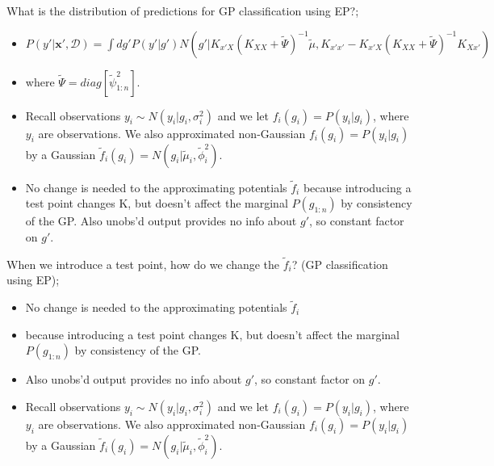 \documentclass{article}
\begin{document}
What is the distribution of predictions for GP classification using EP?; \begin{itemize}
    \item $P(y'|\mathbf{x'}, \mathcal{D}) = \int dg' P(y'|g')N(g' | K_{x'X}(K_{XX}+\tilde{\Psi})^{-1}\tilde{\mu}, K_{x'x'} - K_{x'X}(K_{XX}+\tilde{\Psi})^{-1}K_{Xx'})$
    \item where $\tilde{\Psi} = diag[\tilde{\psi}^2_{1:n}]$.
    \item Recall observations $y_i \sim N(y_i | g_i, \sigma^2_i)$ and we let $f_i(g_i) = P(y_i|g_i)$, where $y_i$ are observations. We also approximated non-Gaussian $f_i(g_i) = P(y_i|g_i)$ by a Gaussian $\tilde{f}_i(g_i) = N(g_i | \tilde{\mu}_i, \tilde{\phi}^2_i)$.
    \item No change is needed to the approximating potentials $\tilde{f}_i$ because introducing a test point changes K, but doesn't affect the marginal $P(g_{1:n})$ by consistency of the GP. Also unobs'd output provides no info about $g'$, so constant factor on $g'$.
\end{itemize}

When we introduce a test point, how do we change the $\tilde{f}_i$? (GP classification using EP); \begin{itemize}
    \item No change is needed to the approximating potentials $\tilde{f}_i$ 
    \item because introducing a test point changes K, but doesn't affect the marginal $P(g_{1:n})$ by consistency of the GP. \item Also unobs'd output provides no info about $g'$, so constant factor on $g'$.
    \item Recall observations $y_i \sim N(y_i | g_i, \sigma^2_i)$ and we let $f_i(g_i) = P(y_i|g_i)$, where $y_i$ are observations. We also approximated non-Gaussian $f_i(g_i) = P(y_i|g_i)$ by a Gaussian $\tilde{f}_i(g_i) = N(g_i | \tilde{\mu}_i, \tilde{\phi}^2_i)$.
\end{itemize}

\end{document}
